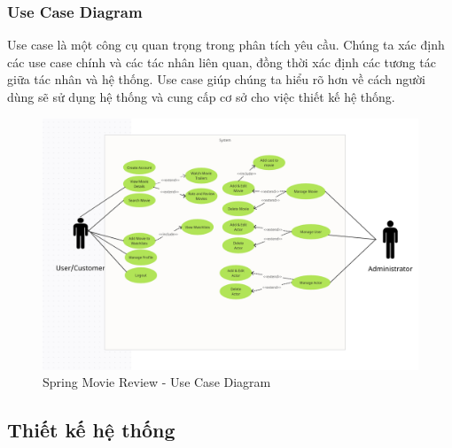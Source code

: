 \documentclass[12pt]{article}
\begin{document}
\subsubsection{Use Case Diagram}
Use case là một công cụ quan trọng trong phân tích yêu cầu. Chúng ta xác định các use case chính và các tác nhân liên quan, đồng thời xác định các tương tác giữa tác nhân và hệ thống. Use case giúp chúng ta hiểu rõ hơn về cách người dùng sẽ sử dụng hệ thống và cung cấp cơ sở cho việc thiết kế hệ thống.
\begin{figure}[H]
    \centering
    \includegraphics[scale=0.45]{Figs/Use_case.png}
    \caption{Spring Movie Review - Use Case Diagram}
\end{figure}
\subsection{Thiết kế hệ thống}
\end{document}
